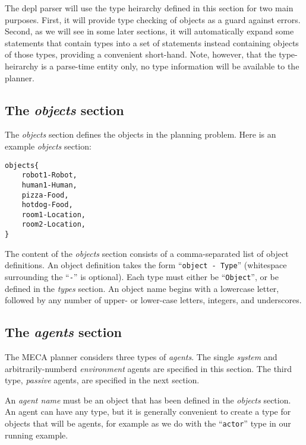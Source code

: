 \documentclass{article}
\begin{document}
The depl parser will use the type heirarchy defined in this section for two main
purposes. First, it will provide type checking of objects as a guard against errors.
Second, as we will see in some later sections, it will automatically expand some
statements that contain types into a set of statements instead containing
objects of those types, providing a convenient short-hand. Note, however, that
the type-heirarchy is a parse-time entity only, no type information will be
available to the planner.


\subsection{The \emph{objects} section}

The \emph{objects} section defines the objects in the planning problem.
Here is an example \emph{objects} section:
\begin{verbatim}
objects{
    robot1-Robot,
    human1-Human,
    pizza-Food,
    hotdog-Food,
    room1-Location,
    room2-Location,
}
\end{verbatim}

The content of the \emph{objects} section consists of a comma-separated list of
object definitions. An object definition takes the form ``\texttt{object -
Type}'' (whitespace surrounding the ``\texttt{-}'' is optional). Each type must
either be ``\texttt{Object}'', or be defined in the \emph{types} section.  An
object name begins with a lowercase letter, followed by any number of upper-
or lower-case letters, integers, and underscores.



\subsection{The \emph{agents} section}

The MECA planner considers three types of \emph{agents}. The single
\emph{system} and arbitrarily-numberd \emph{environment} agents are specified in
this section.  The third type, \emph{passive} agents, are specified in the next
section.

An \emph{agent name} must be an object that has been defined in the
\emph{objects} section. An agent can have any type, but it is generally
convenient to create a type for objects that will be agents, for example 
as we do with the ``\texttt{actor}'' type in our running example.
\end{document}
